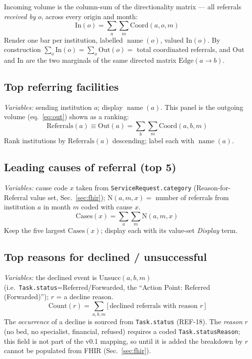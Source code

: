 \documentclass[11pt]{article}
\newcommand{\Coord}{\mathrm{Coord}}
\newcommand{\Unsucc}{\mathrm{Unsucc}}
\newcommand{\name}{\operatorname{name}}
\newcommand{\fhir}[1]{\texttt{#1}}
\begin{document}
Incoming volume is the column-sum of the directionality matrix --- all referrals \emph{received by} $o$, across every origin and month:
\begin{equation}
\mathrm{In}(o) = \sum_{a}\sum_{m} \Coord(a,o,m) \label{eq:in}
\end{equation}
Render one bar per institution, labelled $\name(o)$, valued $\mathrm{In}(o)$. By construction $\sum_{o}\mathrm{In}(o) = \sum_{o}\mathrm{Out}(o) = $ total coordinated referrals, and $\mathrm{Out}$ and $\mathrm{In}$ are the two marginals of the same directed matrix $\mathrm{Edge}(a\!\to\! b)$.

\subsection{Top referring facilities}\label{sec:topref}
\textit{Variables:} sending institution $a$; display $\name(a)$. This panel is the outgoing volume (eq.~\ref{eq:out}) shown as a ranking:
\begin{equation}
\mathrm{Referrals}(a) \equiv \mathrm{Out}(a) = \sum_{b}\sum_{m} \Coord(a,b,m) \label{eq:topref}
\end{equation}
Rank institutions by $\mathrm{Referrals}(a)$ descending; label each with $\name(a)$.

\subsection{Leading causes of referral (top 5)}\label{sec:causes}
\textit{Variables:} cause code $x$ taken from \fhir{ServiceRequest.category} (Reason-for-Referral value set, Sec.~\ref{sec:fhir}); $\mathrm{N}(a,m,x)=$ number of referrals from institution $a$ in month $m$ coded with cause $x$.
\begin{equation}
\mathrm{Cases}(x) = \sum_{a}\sum_{m} \mathrm{N}(a,m,x) \label{eq:cases}
\end{equation}
Keep the five largest $\mathrm{Cases}(x)$; display each with its value-set \emph{Display} term.

\subsection{Top reasons for declined / unsuccessful}\label{sec:declined}
\textit{Variables:} the declined event is $\Unsucc(a,b,m)$ (i.e.\ \fhir{Task.status}=Referred/Forwarded, the ``Action Point: Referred (Forwarded)''); $r$ = a decline reason.
\begin{equation}
\mathrm{Count}(r) = \sum_{a,b,m} \bigl[\,\text{declined referrals with reason } r\,\bigr] \label{eq:count}
\end{equation}
The \emph{occurrence} of a decline is sourced from \fhir{Task.status} (REF-18). The \emph{reason} $r$ (no bed, no specialist, financial, refused) requires a coded \fhir{Task.statusReason}; this field is not part of the v0.1 mapping, so until it is added the breakdown by $r$ cannot be populated from FHIR (Sec.~\ref{sec:fhir}).
\end{document}
